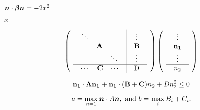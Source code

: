 {\newpage\clearpage
{}%
$\mbox{\boldmath {$n$}}\cdot\mbox{\boldmath {$\beta$}}\mbox{\boldmath {$n$}}=-2x^2$%
\lthtmlinlinemathZ
\lthtmlcheckvsize\clearpage}

{\newpage\clearpage
{}%
$x$%
\lthtmlinlinemathZ
\lthtmlcheckvsize\clearpage}

{\newpage\clearpage
{}%
\begin{displaymath}
\left(
  \mbox{
     \begin{tabular}{c|c}
       $\begin{array}{ccc}\ddots\\&{\bf A}\\&&\ddots\end{array}$\  & 
       $\begin{array}{c}\vdots\\{\bf B}\\\vdots\end{array}$\  \\
       \hline
       $\begin{array}{ccc}\cdots&{\bf C}&\cdots\end{array}$\  & D
     \end{tabular}
   }
\right)
\left(
  \mbox{
     \begin{tabular}{c}
     $\begin{array}{c}\vdots\\{\bf n_1}\\\vdots\end{array}$\\
     \hline
     $n_2$
     \end{tabular}
    }
\right)
\end{displaymath}%
\lthtmldisplayZ
\lthtmlcheckvsize\clearpage}

{\newpage\clearpage
{}%
\begin{displaymath}
{\bf n_1}\cdot{\bf A}{\bf n_1} + {\bf n_1}\cdot({\bf B}+{\bf C})n_2 +
Dn_2^2 \leq 0
\end{displaymath}%
\lthtmldisplayZ
\lthtmlcheckvsize\clearpage}

{\newpage\clearpage
{}%
\begin{displaymath}
a=\max_{n=1} \mbox{\boldmath {$n$}}\cdot A\mbox{\boldmath {$n$}},\mbox{ and } b=\max_{i}B_i+C_i.
\end{displaymath}%
\lthtmldisplayZ
\lthtmlcheckvsize\clearpage}

